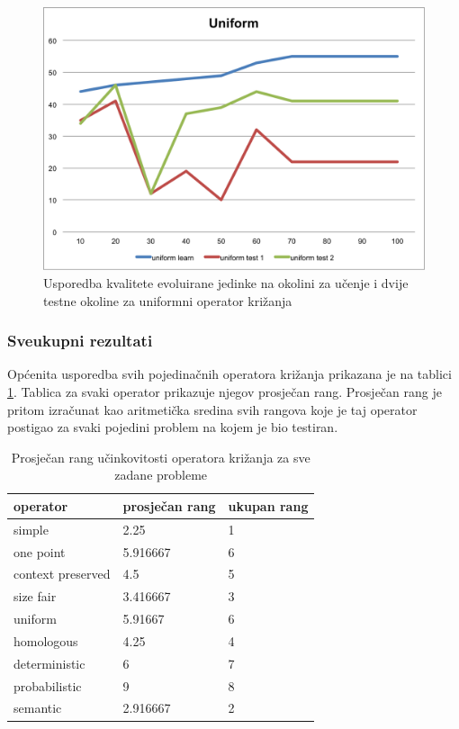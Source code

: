\begin{figure}[H]
	\centering
	\includegraphics[scale=0.8]{./slike/cross-validation/uniform.png}
	\caption{Usporedba kvalitete evoluirane jedinke na okolini za učenje i dvije testne okoline za uniformni operator križanja}
	\label{uniform}
\end{figure}


\subsubsection{Sveukupni rezultati}
Općenita usporedba svih pojedinačnih operatora križanja prikazana je na tablici \ref{overAllTable}. Tablica za svaki operator prikazuje njegov prosječan rang. Prosječan rang je pritom izračunat kao aritmetička sredina svih rangova koje je taj operator postigao za svaki pojedini problem na kojem je bio testiran.

\begin{table}[H]
 	\centering

    \begin{tabular}{| l | l | l |}
    \hline
   \textbf{operator} & \textbf{prosječan rang} & \textbf{ukupan rang} \\ \hline
   simple & 2.25 & 1\\ \hline
   one point & 5.916667 & 6\\ \hline
   context preserved & 4.5 & 5 \\ \hline
   size fair & 3.416667 & 3\\ \hline
   uniform & 5.91667 & 6\\ \hline
   homologous & 4.25 & 4\\ \hline
   deterministic & 6 & 7\\ \hline
   probabilistic & 9 & 8\\ \hline
   semantic & 2.916667 & 2\\ \hline

 
    \end{tabular}
    
    \caption{Prosječan rang učinkovitosti operatora križanja za sve zadane probleme}
    \label{overAllTable}
\end{table}

